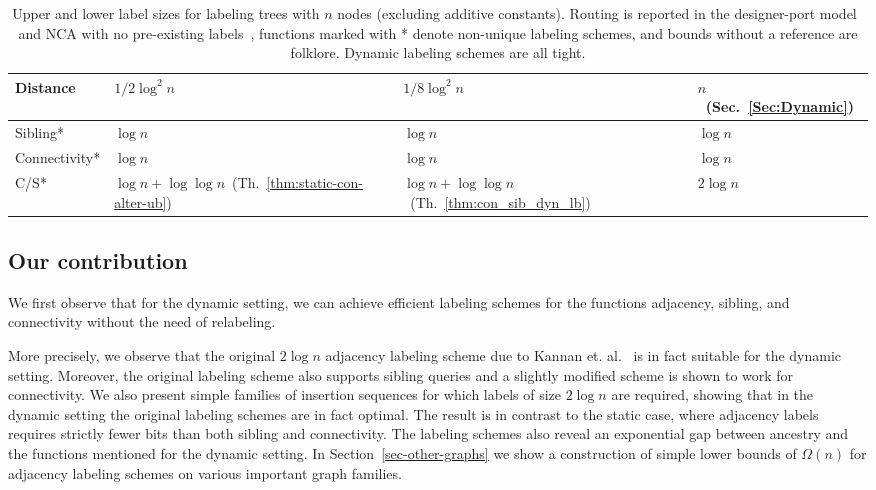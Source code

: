 \documentclass{llncs}
\newcommand{\sd}[1]{{#1}}
\newcommand{\drop}[1]{}
\begin{document}
\begin {table}[h]
\begin{center}
\begin{tabular}{ | l | l | l | l | }
		    Distance	& $1/2 \log^2 n$~\cite{Peleg00}  & $1/8 \log^2 n$~\cite{Peleg00}  & {\color{blue} $n$~(Sec.~\ref{Sec:Dynamic})} \\  \hline\hline
		    Sibling*  		&$\log n$  & $\log n$  & $ \log n$ \\ \hline
		   Connectivity*  	&$\log n$ & $\log n $  & $ \log n$ \\ \hline
		    C/S*  	& {\color{blue} $\log n+ \log \log n
$~(Th.~\ref{thm:static-con-alter-ub})} & {\color{blue} $\log n+ \log \log
n$~(Th.~\ref{thm:con_sib_dyn_lb})}  & $ 2\log n$ \\ \hline
	    \end{tabular}
	 \end{center}
	 	 	\caption{Upper and lower  label sizes  for labeling  trees with $n$ nodes (excluding additive constants).
			 Routing  is reported in the designer-port model~\cite{Fraigniaud01} and NCA with no pre-existing labels~\cite{alstrup2013near},
			 functions marked with * denote non-unique labeling schemes, and bounds without a reference are folklore.
			 Dynamic labeling schemes are all tight.}
	\label{table:complexities}
\end {table}

\subsection{Our contribution}
We first \sd{observe} that for \sd{the dynamic setting, we can achieve efficient
labeling schemes for the functions adjacency, sibling, and connectivity
without the need of relabeling.}
\drop{the functions adjacency, sibling and connectivity no
relabeling is required to achieve efficient dynamic labeling schemes.}
More precisely, we observe that the original $2 \log n$ adjacency labeling
scheme due to  Kannan et. al.~\cite{Kannan92} is in fact suitable for the
dynamic setting. Moreover, the original labeling scheme also supports sibling
queries and a slightly modified scheme is shown to work for connectivity. We
also present simple families of insertion sequences for which labels of size
$2\log n$ are required, showing that in the dynamic setting the original
labeling schemes are in fact optimal. The result is in contrast to the static
case, where adjacency labels requires strictly fewer bits than both sibling and
connectivity. The labeling schemes also reveal an exponential gap between
ancestry and  the functions mentioned for the dynamic setting. In
Section~\ref{sec-other-graphs} we show a construction of simple lower bounds of
$\Omega(n)$ for adjacency labeling schemes on various important graph
families.
\end{document}
